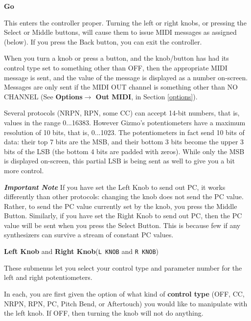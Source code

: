 \documentclass{article}
\begin{document}
	\begin{description}

	\item{\bf Go}
	
	This enters the controller proper.  Turning the left or right knobs, or pressing the Select or Middle buttons, will cause them to issue MIDI messages as assigned (below).  If you press the Back button, you can exit the controller.
	
	When you turn a knob or press a button, and the knob/button has had its control type set to something other than OFF, then the appropriate MIDI message is sent, and the value of the message is displayed as a number on-screen.  Messages are only sent if the MIDI OUT channel is something other than NO CHANNEL (See {\bf Options\(\boldsymbol\rightarrow\) Out MIDI}, in Section \ref{options}).
	
	Several protocols (NRPN, RPN, some CC) can accept 14-bit numbers, that is, values in the range 0...16383.  However Gizmo's potentiometers have a maximum resolution of 10 bits, that is, 0...1023.   The potentiometers in fact send 10 bits of data: their top 7 bits are the MSB, and their bottom 3 bits become the upper 3 bits of the LSB (the bottom 4 bits are padded with zeros).   While only the MSB is displayed on-screen, this partial LSB is being sent as well to give you a bit more control.  %

	{\bf \textit{Important Note}\quad} If you have set the Left Knob to send out PC, it works differently than other protocols: changing the knob does not send the PC value.  Rather, to send the PC value currently set by the knob, you press the Middle Button.  Similarly, if you have set the Right Knob to send out PC, then the PC value will be sent when you press the Select Button.  This is because few if any synthesizers can survive a stream of constant PC values.
	
	\item{\bf Left Knob} and {\bf Right Knob}\quad (\texttt{L KNOB} and \texttt{R KNOB})
	
	These submenus let you select your control type and parameter number for the left and right potentiometers.
	
	In each, you are first given the option of what kind of {\bf control type} (OFF, CC, NRPN, RPN, PC, Pitch Bend, or Aftertouch) %
you would like to manipulate with the left knob.  If OFF, then turning the knob will not do anything.


\end{description}
\end{document}
